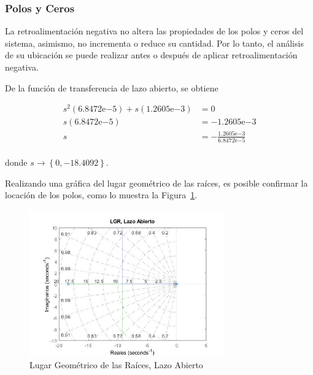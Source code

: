 \documentclass[12pt,a4paper]{article}
\newcommand{\expnum}[2]{{#1}\mathrm{e}{#2}}
\begin{document}
        \subsubsection{Polos y Ceros}

        La retroalimentación negativa no altera las propiedades de los polos y ceros del sistema, asimismo, no 
        incrementa o reduce su cantidad. Por lo tanto, el análisis de su ubicación se puede realizar antes o después de
        aplicar retroalimentación negativa. 

        De la función de transferencia de lazo abierto, se obtiene

          \begin{equation*}
            \begin{aligned}
              s^{2}\left(\expnum{6.8472}{-5}\right) + s\left(\expnum{1.2605}{-3}\right) &= 0 \\
              s\left(\expnum{6.8472}{-5}\right) &= -\expnum{1.2605}{-3} \\
              s &= -\frac{\expnum{1.2605}{-3}}{\expnum{6.8472}{-5}} \\
            \end{aligned}
            \label{eq*:modeling:roots}
          \end{equation*}    

          donde \(s \rightarrow \left\{0, -18.4092\right\}\).

          Realizando una gráfica del lugar geométrico de las raíces, es posible confirmar la locación de los polos, 
          como lo muestra la Figura~\ref{fig:modeling:rlocus_open}.

          \begin{figure}
            \centering
            \includegraphics[width=0.75\textwidth, keepaspectratio]{./Resources/OpenLoopLoci.jpg}
            \caption{Lugar Geométrico de las Raíces, Lazo Abierto}
            \label{fig:modeling:rlocus_open}
          \end{figure}
\end{document}
